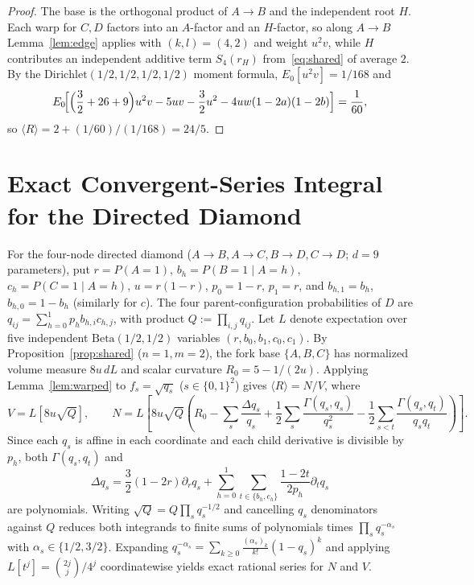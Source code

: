 \documentclass[11pt]{article}
\theoremstyle{plain}
\theoremstyle{definition}
\theoremstyle{remark}
\begin{document}
\begin{proof}
The base is the orthogonal product of $A \to B$ and the independent root $H$. Each warp for $C, D$ factors into an $A$-factor and an $H$-factor, so along $A \to B$ Lemma~\ref{lem:edge} applies with $(k, l) = (4, 2)$ and weight $u^2 v$, while $H$ contributes an independent additive term $S_4(r_H)$ from~\eqref{eq:shared} of average $2$. By the $\mathrm{Dirichlet}(1/2,1/2,1/2,1/2)$ moment formula, $E_0[u^2 v] = 1/168$ and
\[
E_0\!\Bigl[\Bigl(\frac{3}{2} + 26 + 9\Bigr)u^2 v - 5uv - \frac{3}{2}u^2 - 4uw(1-2a)(1-2b)\Bigr] = \frac{1}{60},
\]
so $\langle R \rangle = 2 + (1/60)/(1/168) = 24/5$.
\end{proof}

\section{Exact Convergent-Series Integral for the Directed Diamond}

For the four-node directed diamond ($A \to B, A \to C, B \to D, C \to D$; $d = 9$ parameters), put $r = P(A=1)$, $b_h = P(B=1 \mid A=h)$, $c_h = P(C=1 \mid A=h)$, $u = r(1-r)$, $p_0 = 1-r$, $p_1 = r$, and $b_{h,1} = b_h$, $b_{h,0} = 1 - b_h$ (similarly for $c$). The four parent-configuration probabilities of $D$ are $q_{ij} = \sum_{h=0}^1 p_h b_{h,i} c_{h,j}$, with product $Q := \prod_{i,j} q_{ij}$. Let $L$ denote expectation over five independent $\mathrm{Beta}(1/2, 1/2)$ variables $(r, b_0, b_1, c_0, c_1)$. By Proposition~\ref{prop:shared} ($n=1, m=2$), the fork base $\{A, B, C\}$ has normalized volume measure $8u\,dL$ and scalar curvature $R_0 = 5 - 1/(2u)$. Applying Lemma~\ref{lem:warped} to $f_s = \sqrt{q_s}$ ($s \in \{0,1\}^2$) gives $\langle R \rangle = N / V$, where
\[
V = L[8u\sqrt{Q}], \qquad
N = L\!\left[8u\sqrt{Q}\left(R_0 - \sum_s \frac{\Delta q_s}{q_s} + \frac{1}{2}\sum_s \frac{\Gamma(q_s, q_s)}{q_s^2} - \frac{1}{2}\sum_{s<t}\frac{\Gamma(q_s, q_t)}{q_s q_t}\right)\right].
\]
Since each $q_s$ is affine in each coordinate and each child derivative is divisible by $p_h$, both $\Gamma(q_s, q_t)$ and
\[
\Delta q_s = \frac{3}{2}(1-2r)\partial_r q_s + \sum_{h=0}^1 \sum_{t \in \{b_h, c_h\}} \frac{1-2t}{2p_h}\partial_t q_s
\]
are polynomials. Writing $\sqrt{Q} = Q \prod_s q_s^{-1/2}$ and cancelling $q_s$ denominators against $Q$ reduces both integrands to finite sums of polynomials times $\prod_s q_s^{-\alpha_s}$ with $\alpha_s \in \{1/2, 3/2\}$. Expanding $q_s^{-\alpha_s} = \sum_{k \ge 0} \frac{(\alpha_s)_k}{k!}(1-q_s)^k$ and applying $L[t^j] = \binom{2j}{j}/4^j$ coordinatewise yields exact rational series for $N$ and $V$.
\end{document}

